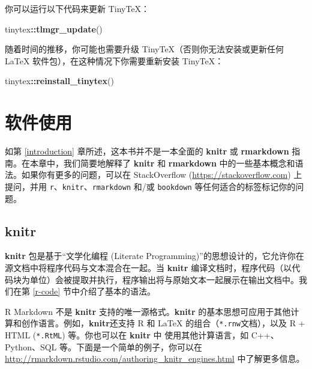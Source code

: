\documentclass[
  12pt,
]{krantz}
\newenvironment{Shaded}{\begin{snugshade}}{\end{snugshade}}
\newcommand{\FunctionTok}[1]{\textcolor[rgb]{0.13,0.29,0.53}{\textbf{#1}}}
\newcommand{\NormalTok}[1]{#1}
\newcommand{\SpecialCharTok}[1]{\textcolor[rgb]{0.81,0.36,0.00}{\textbf{#1}}}
\theoremstyle{definition}
\theoremstyle{definition}
\theoremstyle{definition}
\theoremstyle{definition}
\theoremstyle{remark}
\begin{document}
你可以运行以下代码来更新 TinyTeX：

\begin{Shaded}
\begin{Highlighting}[]
\NormalTok{tinytex}\SpecialCharTok{::}\FunctionTok{tlmgr\_update}\NormalTok{()}
\end{Highlighting}
\end{Shaded}

随着时间的推移，你可能也需要升级 TinyTeX（否则你无法安装或更新任何 LaTeX 软件包），在这种情况下你需要重新安装 TinyTeX：

\begin{Shaded}
\begin{Highlighting}[]
\NormalTok{tinytex}\SpecialCharTok{::}\FunctionTok{reinstall\_tinytex}\NormalTok{()}
\end{Highlighting}
\end{Shaded}

\chapter{软件使用}\label{software-usage}

如第 \ref{introduction} 章所述，这本书并不是一本全面的 \textbf{knitr} 或 \textbf{rmarkdown} 指南。在本章中，我们简要地解释了 \textbf{knitr} 和 \textbf{rmarkdown} 中的一些基本概念和语法。如果你有更多的问题，可以在 StackOverflow (\url{https://stackoverflow.com}) 上提问，并用 \texttt{r}、\texttt{knitr}、\texttt{rmarkdown} 和/或 \texttt{bookdown} 等任何适合的标签标记你的问题。

\section{knitr}\label{knitr}

\textbf{knitr} 包是基于``文学化编程 (Literate Programming)''\citep{knuth1984}的思想设计的，它允许你在源文档中将程序代码与文本混合在一起。当 \textbf{knitr} 编译文档时，程序代码（以代码块为单位）会被提取并执行，程序输出将与原始文本一起展示在输出文档中。我们在第 \ref{r-code} 节中介绍了基本的语法。

R Markdown 不是 \textbf{knitr} 支持的唯一源格式。\textbf{knitr} 的基本思想可应用于其他计算和创作语言。例如，\textbf{knitr}还支持 R 和 LaTeX 的组合（\texttt{*.rnw}文档），以及 R + HTML (\texttt{*.RtML}) 等。你也可以在 \textbf{knitr} 中 使用其他计算语言，如 C++、Python、SQL 等。下面是一个简单的例子，你可以在 \url{http://rmarkdown.rstudio.com/authoring_knitr_engines.html} 中了解更多信息。
\end{document}
